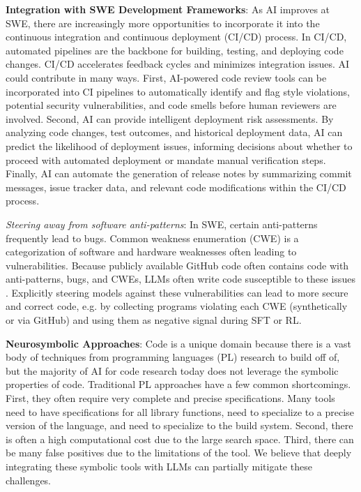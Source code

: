 \textbf{Integration with SWE Development Frameworks}: As AI improves at SWE, there are increasingly more opportunities to incorporate it into the continuous integration and continuous deployment (CI/CD) process. In CI/CD, automated pipelines are the backbone for building, testing, and deploying code changes. CI/CD accelerates feedback cycles and minimizes integration issues. AI could contribute in many ways. First, AI-powered code review tools can be incorporated into CI pipelines to automatically identify and flag style violations, potential security vulnerabilities, and code smells before human reviewers are involved. Second, AI can provide intelligent deployment risk assessments. By analyzing code changes, test outcomes, and historical deployment data, AI can predict the likelihood of deployment issues, informing decisions about whether to proceed with automated deployment or mandate manual verification steps. Finally, AI can automate the generation of release notes by summarizing commit messages, issue tracker data, and relevant code modifications within the CI/CD process.

\textit{Steering away from software anti-patterns}: In SWE, certain anti-patterns frequently lead to bugs. Common weakness enumeration (CWE) is a categorization of software and hardware weaknesses often leading to vulnerabilities. Because publicly available GitHub code often contains code with anti-patterns, bugs, and CWEs, LLMs often write code susceptible to these issues \citep{asare2023github, fu2023security}. Explicitly steering models against these vulnerabilities can lead to more secure and correct code, e.g. by collecting programs violating each CWE (synthetically or via GitHub) and using them as negative signal during SFT or RL.

\textbf{Neurosymbolic Approaches}: Code is a unique domain because there is a vast body of techniques from programming languages (PL) research to build off of, but the majority of AI for code research today does not leverage the symbolic properties of code. Traditional PL approaches have a few common shortcomings. First, they often require very complete and precise specifications. Many tools need to have specifications for all library functions, need to specialize to a precise version of the language, and need to specialize to the build system. Second, there is often a high computational cost due to the large search space. Third, there can be many false positives due to the limitations of the tool. We believe that deeply integrating these symbolic tools with LLMs can partially mitigate these challenges. 

